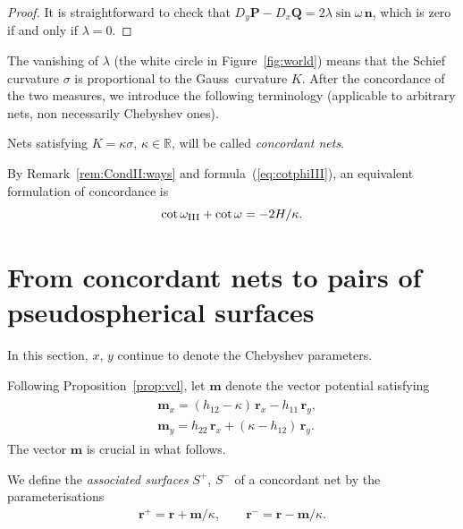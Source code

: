 \documentclass[pdftex]{sigma}
\let\ve\mathbf
\def\h#1#2{h_{#1#2}}
\def\omegaIII{\omega_{\hbox{\sc iii}}}
\def\f{\omega}
\def\k{\kappa}
\def\l{\lambda}
\def\eqref#1{{\rm(\ref{#1})}}
\numberwithin{equation}{section}
\begin{document}
\begin{proof}
It is straightforward to check that
$D_y \ve P - D_x \ve Q = 2\l \sin\f\, \ve n$,
which is zero if and only if $\lambda = 0$.
\end{proof}

The vanishing of $\l$ (the white circle in Figure~\ref{fig:world})
means that the Schief curvature $\sigma$ is proportional to the Gauss\
curvature $K$.
After the concordance of the two measures, we introduce the following terminology
(applicable to arbitrary nets, non necessarily Chebyshev ones).

\begin{Definition}
Nets satisfying $K = \k \sigma$, $\k \in \mathbb R$,
will be called {\it concordant nets}.
\end{Definition}

By Remark~\ref{rem:CondII:ways} and  formula~\eqref{eq:cotphiIII},
an equivalent formulation of concordance is
\[
{\cot\omegaIII} + {\cot\omega} = -2 H/\k.
\]

\section{From concordant nets to pairs of pseudospherical surfaces}
\label{sect:ccnets->PS}

In this section, $x$, $y$ continue to denote the Chebyshev parameters.

Following Proposition~\ref{prop:vcl},
let $\ve m$ denote the vector potential satisfying
\begin{gather}\label{m}
\begin{split}
&\ve m_x = (\h12 - \k)\,\ve r_x - \h11\,\ve r_y, \\
&\ve m_y = \h22\,\ve r_x + (\k - \h12)\,\ve r_y.
\end{split}
\end{gather}
The vector $\ve m$ is crucial in what follows.

\begin{Definition}
We define the {\it associated surfaces\/} $S^+$, $S^-$ of a concordant
net by the parameterisations
\begin{gather}\label{eq:assoc}
\ve r^+ = \ve r + \ve m/\k, \qquad
\ve r^- = \ve r - \ve m/\k.
\end{gather}
\end{Definition}
\end{document}
